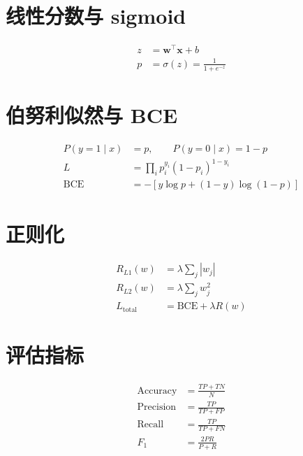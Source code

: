 \documentclass[11pt]{article}
\begin{document}
\section*{线性分数与 sigmoid}
\begin{align}
z &= \mathbf{w}^{\top}\mathbf{x} + b \\
p &= \sigma(z) = \frac{1}{1+e^{-z}}
\end{align}

\section*{伯努利似然与 BCE}
\begin{align}
P(y=1\mid x) &= p, \qquad P(y=0\mid x) = 1-p \\
L &= \prod_i p_i^{y_i}(1-p_i)^{1-y_i} \\
\mathrm{BCE} &= -\left[y\log p + (1-y)\log(1-p)\right]
\end{align}

\section*{正则化}
\begin{align}
R_{L1}(w) &= \lambda\sum_j |w_j| \\
R_{L2}(w) &= \lambda\sum_j w_j^2 \\
L_{\mathrm{total}} &= \mathrm{BCE} + \lambda R(w)
\end{align}

\section*{评估指标}
\begin{align}
\mathrm{Accuracy} &= \frac{TP+TN}{N} \\
\mathrm{Precision} &= \frac{TP}{TP+FP} \\
\mathrm{Recall} &= \frac{TP}{TP+FN} \\
F_1 &= \frac{2PR}{P+R}
\end{align}
\end{document}
